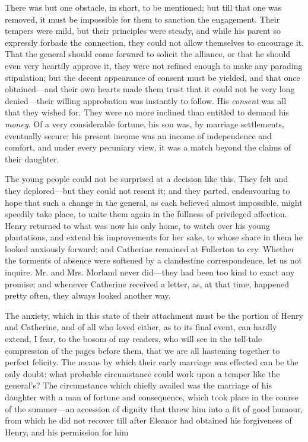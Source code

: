 There was but one obstacle, in short, to be mentioned; but till that one was removed, it must be impossible for them to sanction the engagement. Their tempers were mild, but their principles were steady, and while his parent so expressly forbade the connection, they could not allow themselves to encourage it. That the general should come forward to solicit the alliance, or that he should even very heartily approve it, they were not refined enough to make any parading stipulation; but the decent appearance of consent must be yielded, and that once obtained---and their own hearts made them trust that it could not be very long denied---their willing approbation was instantly to follow. His {\em consent} was all that they wished for. They were no more inclined than entitled to demand his {\em money}. Of a very considerable fortune, his son was, by marriage settlements, eventually secure; his present income was an income of independence and comfort, and under every pecuniary view, it was a match beyond the claims of their daughter.

The young people could not be surprised at a decision like this. They felt and they deplored---but they could not resent it; and they parted, endeavouring to hope that such a change in the general, as each believed almost impossible, might speedily take place, to unite them again in the fullness of privileged affection. Henry returned to what was now his only home, to watch over his young plantations, and extend his improvements for her sake, to whose share in them he looked anxiously forward; and Catherine remained at Fullerton to cry. Whether the torments of absence were softened by a clandestine correspondence, let us not inquire. Mr. and Mrs. Morland never did---they had been too kind to exact any promise; and whenever Catherine received a letter, as, at that time, happened pretty often, they always looked another way.

The anxiety, which in this state of their attachment must be the portion of Henry and Catherine, and of all who loved either, as to its final event, can hardly extend, I fear, to the bosom of my readers, who will see in the tell-tale compression of the pages before them, that we are all hastening together to perfect felicity. The means by which their early marriage was effected can be the only doubt: what probable circumstance could work upon a temper like the general's? The circumstance which chiefly availed was the marriage of his daughter with a man of fortune and consequence, which took place in the course of the summer---an accession of dignity that threw him into a fit of good humour, from which he did not recover till after Eleanor had obtained his forgiveness of Henry, and his permission for him 

